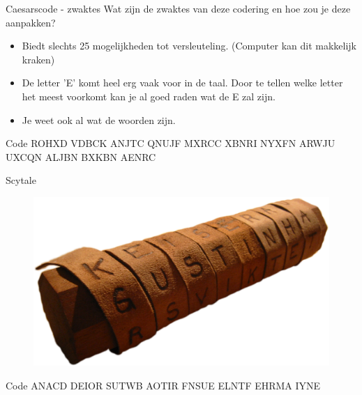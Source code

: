 \documentclass{beamer}
\begin{document}


\begin{frame}[fragile]{Caesarscode - zwaktes}
	Wat zijn de zwaktes van deze codering en hoe zou je deze aanpakken?
	\pause
	\begin{itemize}
		\item Biedt slechts 25 mogelijkheden tot versleuteling. (Computer kan dit makkelijk kraken)
		\item De letter 'E' komt heel erg vaak voor in de taal. 
		Door te tellen welke letter het meest voorkomt kan je al goed raden wat de E zal zijn. 
		\item Je weet ook al wat de woorden zijn.
	\end{itemize}

\begin{center}
\begin{block}{Code}
ROHXD VDBCK ANJTC QNUJF MXRCC XBNRI
NYXFN ARWJU UXCQN ALJBN BXKBN AENRC
\end{block}
\end{center}
\end{frame}





\begin{frame}[fragile]{Scytale}
	\begin{figure}
		\includegraphics[width=\textwidth]{img/scytale}
	\end{figure}

\begin{block}{Code}
	ANACD DEIOR SUTWB AOTIR FNSUE ELNTF EHRMA IYNE
\end{block}
\end{frame}
\end{document}
